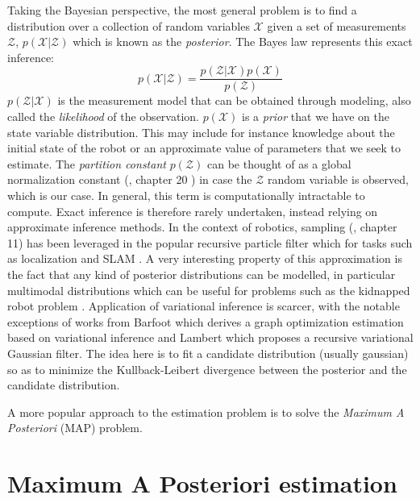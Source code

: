 Taking the Bayesian perspective, the most general problem is to find a distribution over a collection of random variables $\mathcal{X}$ given a set 
of measurements $\mathcal{Z}$, $p(\mathcal{X} | \mathcal{Z})$ which is known as the \textit{posterior}. 
The Bayes law represents this exact inference:
%
\begin{equation}
    p(\mathcal{X} | \mathcal{Z}) = \frac{p(\mathcal{Z} | \mathcal{X}) p(\mathcal{X})}{p(\mathcal{Z})} 
\end{equation}
%
$p(\mathcal{Z} | \mathcal{X})$ is the measurement model that can be obtained through modeling, also called the \textit{likelihood} of the observation. 
$p(\mathcal{X})$ is a \textit{prior} that we have on the state variable distribution. This may include for instance knowledge about the initial state of the robot or
an approximate value of parameters that we seek to estimate.
The \textit{partition constant} $p(\mathcal{Z})$ can be thought of as a global normalization constant (\cite{koller2009probabilistic}, chapter 20 ) in case 
the $\mathcal{Z}$ random variable is observed, which is our case. In general, this term is computationally intractable to compute. Exact inference is 
therefore rarely undertaken, instead relying on approximate inference methods. In the context of robotics, sampling (\cite{koller2009probabilistic}, chapter 11) has been 
leveraged in the popular recursive particle filter which for tasks such as localization \cite{dellaert1999monte} and SLAM \cite{montemerlo2002fastslam}. A very interesting
property of this approximation is the fact that any kind of posterior distributions can be modelled, in particular multimodal distributions which can be useful
for problems such as the kidnapped robot problem \cite{dellaert1999monte}. Application of variational inference is scarcer, with the notable 
exceptions of works from Barfoot \cite{barfoot2020exactly, wong2020variational} which derives a graph optimization estimation based on variational inference
and Lambert \cite{lambert2022recursive} which proposes a recursive variational Gaussian filter. The idea here is to fit a candidate distribution 
(usually gaussian) so as to minimize the Kullback-Leibert divergence between the posterior and the candidate distribution.

A more popular approach to the estimation problem is to solve the \textit{Maximum A Posteriori} (MAP) problem.

\section{Maximum A Posteriori estimation}

